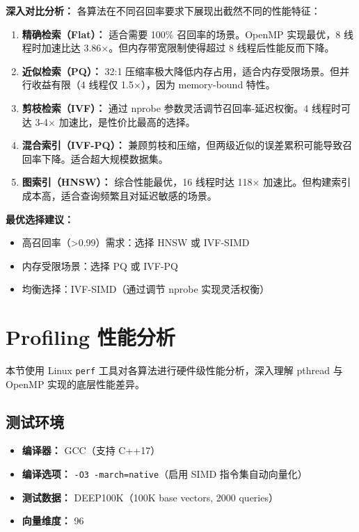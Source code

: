 \documentclass[a4paper]{article}
\begin{document}
\textbf{深入对比分析：} 各算法在不同召回率要求下展现出截然不同的性能特征：

\begin{enumerate}
\item \textbf{精确检索（Flat）：} 适合需要 100\% 召回率的场景。OpenMP 实现最优，8 线程时加速比达 3.86×。但内存带宽限制使得超过 8 线程后性能反而下降。
\item \textbf{近似检索（PQ）：} 32:1 压缩率极大降低内存占用，适合内存受限场景。但并行收益有限（4 线程仅 1.5×），因为 memory-bound 特性。
\item \textbf{剪枝检索（IVF）：} 通过 nprobe 参数灵活调节召回率-延迟权衡。4 线程时可达 3-4× 加速比，是性价比最高的选择。
\item \textbf{混合索引（IVF-PQ）：} 兼顾剪枝和压缩，但两级近似的误差累积可能导致召回率下降。适合超大规模数据集。
\item \textbf{图索引（HNSW）：} 综合性能最优，16 线程时达 118× 加速比。但构建索引成本高，适合查询频繁且对延迟敏感的场景。
\end{enumerate}

\textbf{最优选择建议：}
\begin{itemize}
\item 高召回率（>0.99）需求：选择 HNSW 或 IVF-SIMD
\item 内存受限场景：选择 PQ 或 IVF-PQ
\item 均衡选择：IVF-SIMD（通过调节 nprobe 实现灵活权衡）
\end{itemize}

\section{Profiling 性能分析}

本节使用 Linux \texttt{perf} 工具对各算法进行硬件级性能分析，深入理解 pthread 与 OpenMP 实现的底层性能差异。

\subsection{测试环境}

\begin{itemize}
\item \textbf{编译器：} GCC（支持 C++17）
\item \textbf{编译选项：} \texttt{-O3 -march=native}（启用 SIMD 指令集自动向量化）
\item \textbf{测试数据：} DEEP100K（100K base vectors, 2000 queries）
\item \textbf{向量维度：} 96
\end{itemize}
\end{document}
